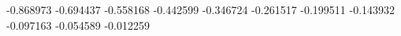 -0.868973
-0.694437
-0.558168
-0.442599
-0.346724
-0.261517
-0.199511
-0.143932
-0.097163
-0.054589
-0.012259

